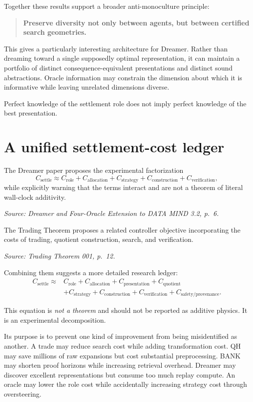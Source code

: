 \documentclass[11pt]{article}
\newcommand{\src}[1]{\par\smallskip\noindent\textit{Source: #1}\normalsize}
\begin{document}
Together these results support a broader anti-monoculture principle:

\begin{quote}
\textbf{Preserve diversity not only between agents, but between certified search geometries.}
\end{quote}

This gives a particularly interesting architecture for Dreamer. Rather than dreaming toward a single supposedly optimal representation, it can maintain a portfolio of distinct consequence-equivalent presentations and distinct sound abstractions. Oracle information may constrain the dimension about which it is informative while leaving unrelated dimensions diverse.

Perfect knowledge of the settlement role does not imply perfect knowledge of the best presentation.

\section{A unified settlement-cost ledger}

The Dreamer paper proposes the experimental factorization
\[
C_{\mathrm{settle}}
\approx
C_{\mathrm{role}}
+C_{\mathrm{allocation}}
+C_{\mathrm{strategy}}
+C_{\mathrm{construction}}
+C_{\mathrm{verification}},
\]
while explicitly warning that the terms interact and are not a theorem of literal wall-clock additivity.
\src{\emph{Dreamer and Four-Oracle Extension to DATA MIND 3.2}, p.~6.}

The Trading Theorem proposes a related controller objective incorporating the costs of trading, quotient construction, search, and verification.
\src{\emph{Trading Theorem 001}, p.~12.}

Combining them suggests a more detailed research ledger:
\[
\begin{aligned}
C_{\mathrm{settle}}
\approx{}&
C_{\mathrm{role}}
+C_{\mathrm{allocation}}
+C_{\mathrm{presentation}}
+C_{\mathrm{quotient}}\\
&+C_{\mathrm{strategy}}
+C_{\mathrm{construction}}
+C_{\mathrm{verification}}
+C_{\mathrm{safety/provenance}}.
\end{aligned}
\]

This equation is \emph{not a theorem} and should not be reported as additive physics. It is an experimental decomposition.

Its purpose is to prevent one kind of improvement from being misidentified as another. A trade may reduce search cost while adding transformation cost. QH may save millions of raw expansions but cost substantial preprocessing. BANK may shorten proof horizons while increasing retrieval overhead. Dreamer may discover excellent representations but consume too much replay compute. An oracle may lower the role cost while accidentally increasing strategy cost through oversteering.
\end{document}
